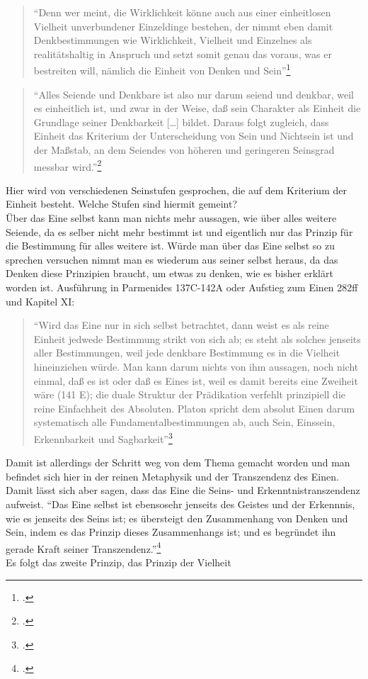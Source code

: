 \documentclass[12pt]{article}
\newcommand*{\zitatblock}[1]{%
    \begin{quote}
    \fontsize{10}{12}\selectfont
    \setlength{\parskip}{1.0em}
    #1
    \end{quote}
}
\begin{document}
\zitatblock{\enquote{Denn wer meint, die Wirklichkeit könne auch aus einer einheitlosen Vielheit unverbundener Einzeldinge bestehen, der nimmt eben damit Denkbestimmungen wie Wirklichkeit, Vielheit und Einzelnes als realitätshaltig in Anspruch und setzt somit genau das voraus, was er bestreiten will, nämlich die Einheit von Denken und Sein}\footcite[][S. 98]{halfwassen2015spuren}}

\zitatblock{\enquote{Alles Seiende und Denkbare ist also nur darum seiend und denkbar, weil es einheitlich ist, und zwar in der Weise, daß sein Charakter als Einheit die Grundlage seiner Denkbarkeit [\dots] bildet. Daraus folgt zugleich, dass Einheit das Kriterium der Unterscheidung von Sein und Nichtsein ist und der Maßstab, an dem Seiendes von höheren und geringeren Seinsgrad messbar wird.}\footcite[vgl.][S. 99]{halfwassen2015spuren}}
Hier wird von verschiedenen Seinstufen gesprochen, die auf dem Kriterium der Einheit besteht. Welche Stufen sind hiermit gemeint?\\
Über das Eine selbst kann man nichts mehr aussagen, wie über alles weitere Seiende, da es selber nicht mehr bestimmt ist und eigentlich nur das Prinzip für die Bestimmung für alles weitere ist. Würde man über das Eine selbst so zu sprechen versuchen nimmt man es wiederum aus seiner selbst heraus, da das Denken diese Prinzipien braucht, um etwas zu denken, wie es bisher erklärt worden ist. Ausführung in Parmenides 137C-142A oder Aufstieg zum Einen 282ff und Kapitel XI:
\zitatblock{\enquote{Wird das Eine nur in sich selbst betrachtet, dann weist es als reine Einheit jedwede Bestimmung strikt von sich ab; es steht als solches jenseits aller Bestimmungen, weil jede denkbare Bestimmung es in die Vielheit hineinziehen würde. Man kann darum nichts von ihm aussagen, noch nicht einmal, daß es ist oder daß es Eines ist, weil es damit bereits eine Zweiheit wäre (141 E); die duale Struktur der Prädikation verfehlt prinzipiell die reine Einfachheit des Absoluten. Platon spricht dem absolut Einen darum systematisch alle Fundamentalbestimmungen ab, auch Sein, Einssein, Erkennbarkeit und Sagbarkeit}\footcite[][S. 101]{halfwassen2015spuren}}
Damit ist allerdings der Schritt weg von dem Thema gemacht worden und man befindet sich hier in der reinen Metaphysik und der Transzendenz des Einen. 
Damit lässt sich aber sagen, dass das Eine die Seins- und Erkenntnistranszendenz aufweist. \enquote{Das Eine selbst ist ebensosehr jenseits des Geistes und der Erkennnis, wie es jenseits des Seins ist; es übersteigt den Zusammenhang von Denken und Sein, indem es das Prinzip dieses Zusammenhangs ist; und es begründet ihn gerade Kraft seiner Transzendenz.}\footcite[][S. 102]{halfwassen2015spuren}\\
Es folgt das zweite Prinzip, das Prinzip der Vielheit
\end{document}
